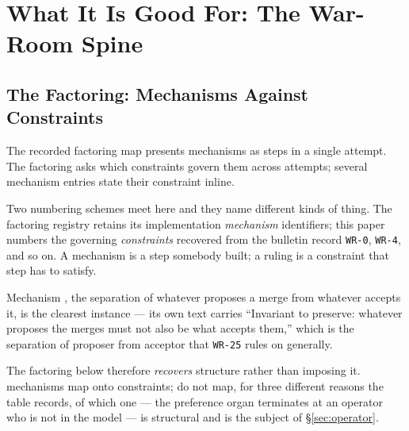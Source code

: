 \section{What It Is Good For: The War-Room Spine}\label{sec:wr-spine}

\subsection*{The Factoring: Mechanisms Against Constraints}\label{sec:factoring}


The recorded factoring map presents \FactoringEdges{} mechanisms as
steps in a single attempt. The factoring asks which constraints govern them
across attempts; several mechanism entries state their constraint inline.

Two numbering schemes meet here and they name different kinds of thing. The
factoring registry retains its implementation \emph{mechanism} identifiers; this paper numbers the governing \emph{constraints}
recovered from the bulletin record \texttt{WR-0}, \texttt{WR-4}, and so on. A
mechanism is a step somebody built; a ruling is a constraint that step has to
satisfy.

Mechanism , the separation of whatever proposes a merge from whatever
accepts it, is the clearest instance --- its own text carries ``Invariant to preserve: whatever proposes the
merges must not also be what accepts them,'' which is the separation of
proposer from acceptor that \texttt{WR-25} rules on generally.

The factoring below therefore \emph{recovers} structure rather than imposing
it. \FactoringEdges{} mechanisms map onto \FactoringWRCovered{} constraints;
\FactoringUnmapped{} do not map, for three different reasons the table
records, of which one --- the preference organ terminates at an operator who
is not in the model --- is structural and is the subject of
\S\ref{sec:operator}.



